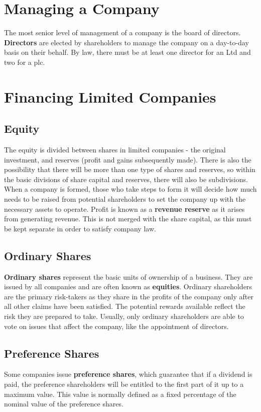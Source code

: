 \documentclass{report}
\begin{document}
\section{Managing a Company}

The most senior level of management of a company is the board of directors. \textbf{Directors} are elected by shareholders to manage the company on a day-to-day basis on their behalf. By law, there must be at least one director for an Ltd and two for a plc.

\section{Financing Limited Companies}

\subsection{Equity}
The equity is divided between shares in limited companies - the original investment, and reserves (profit and gains subsequently made). There is also the possibility that there will be more than one type of shares and reserves, so within the basic divisions of share capital and reserves, there will also be subdivisions.\\

When a company is formed, those who take steps to form it will decide how much needs to be raised from potential shareholders to set the company up with the necessary assets to operate. Profit is known as a \textbf{revenue reserve} as it arises from generating revenue. This is not merged with the share capital, as this must be kept separate in order to satisfy company law. 

\subsection{Ordinary Shares}
\textbf{Ordinary shares} represent the basic units of ownership of a business. They are issued by all companies and are often known as \textbf{equities}. Ordinary shareholders are the primary risk-takers as they share in the profits of the company only after all other claims have been satisfied. The potential rewards available reflect the risk they are prepared to take. Usually, only ordinary shareholders are able to vote on issues that affect the company, like the appointment of directors.

\subsection{Preference Shares}
Some companies issue \textbf{preference shares}, which guarantee that if a dividend is paid, the preference shareholders will be entitled to the first part of it up to a maximum value. This value is normally defined as a fixed percentage of the nominal value of the preference shares.
\end{document}
